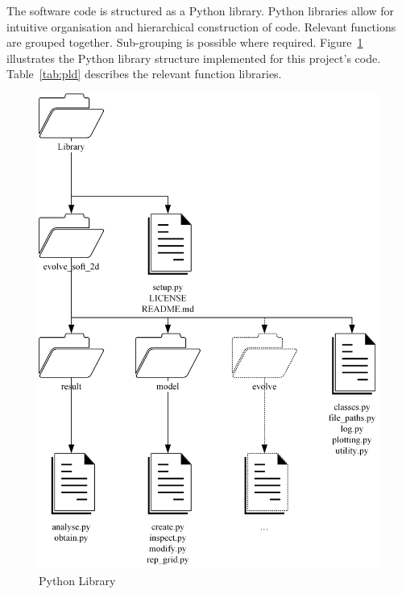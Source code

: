 The software code is structured as a Python library. Python libraries allow for intuitive organisation and hierarchical construction of code. Relevant functions are grouped together. Sub-grouping is possible where required. Figure~\ref{fig:pl} illustrates the Python library structure implemented for this project's code. Table~\ref{tab:pld} describes the relevant function libraries.

\begin{figure}[H]
\begin{center}
	\includegraphics[width=1\textwidth]{pythonlib.png}
	\caption{Python Library}
	\label{fig:pl}
\end{center}
\end{figure}

